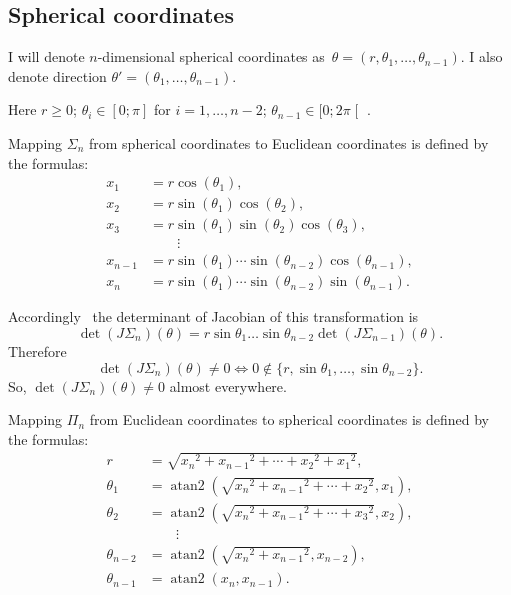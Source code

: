 \documentclass{amsart}
\begin{document}
\subsection{Spherical coordinates}

I will denote $n$-dimensional spherical coordinates as~$\theta=(r, \theta_1,\dots,\theta_{n-1})$.
I also denote direction $\theta'=(\theta_1,\dots,\theta_{n-1})$.

Here $r\geq 0$; $\theta_i\in[0;\pi]$ for $i=1,\dots,n-2$; $\theta_{n-1}\in[0;2\pi\mathclose[$ .

Mapping $\Sigma_n$ from spherical coordinates to Euclidean coordinates is defined by the formulas:
\[
\begin{aligned}x_{1}&=r\cos(\theta _{1}),\\x_{2}&=r\sin(\theta _{1})\cos(\theta _{2}),\\x_{3}&=r\sin(\theta _{1})\sin(\theta _{2})\cos(\theta _{3}),\\&\qquad \vdots \\x_{n-1}&=r\sin(\theta _{1})\cdots \sin(\theta _{n-2})\cos(\theta _{n-1}),\\x_{n}&=r\sin(\theta _{1})\cdots \sin(\theta _{n-2})\sin(\theta _{n-1}).\end{aligned}
\]

Accordingly~\cite{polar-jacobian} the determinant of Jacobian of this transformation is
\[ \det (J\Sigma_n)(\theta) = r\sin\theta_1\dots\sin\theta_{n-2}\det (J\Sigma_{n-1})(\theta). \]
Therefore
\[
\det (J\Sigma_n)(\theta)\ne 0\Leftrightarrow 0\notin\{r,\sin\theta_1,\dots,\sin\theta_{n-2}\}.
\]
So, $\det (J\Sigma_n)(\theta)\ne 0$ almost everywhere.

Mapping $\Pi_n$ from Euclidean coordinates to spherical coordinates is defined by the formulas:
\[
\begin{aligned}r&={\textstyle {\sqrt {{x_{n}}^{2}+{x_{n-1}}^{2}+\cdots +{x_{2}}^{2}+{x_{1}}^{2}}}},\\\theta _{1}&=\operatorname {atan2} \left({\textstyle {\sqrt {{x_{n}}^{2}+{x_{n-1}}^{2}+\cdots +{x_{2}}^{2}}}},x_{1}\right),\\\theta _{2}&=\operatorname {atan2} \left({\textstyle {\sqrt {{x_{n}}^{2}+{x_{n-1}}^{2}+\cdots +{x_{3}}^{2}}}},x_{2}\right),\\&\qquad \vdots \\\theta _{n-2}&=\operatorname {atan2} \left({\textstyle {\sqrt {{x_{n}}^{2}+{x_{n-1}}^{2}}}},x_{n-2}\right),\\\theta _{n-1}&=\operatorname {atan2} \left(x_{n},x_{n-1}\right).\end{aligned}
\]  
\end{document}

